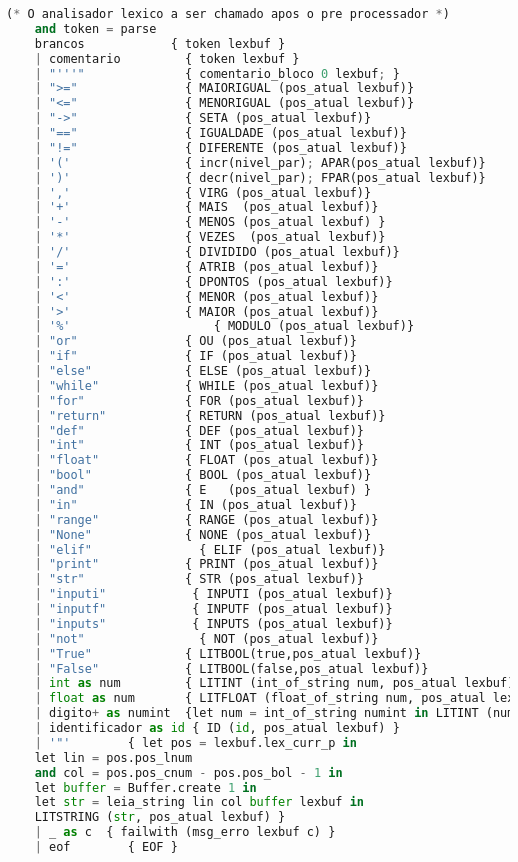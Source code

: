 \documentclass[hidelinks,12pt]{article}
\begin{document}
\begin{appendices}
\begin{lstlisting}[caption=lexico.mll, language=python]
	(* O analisador lexico a ser chamado apos o pre processador *)
	and token = parse
	brancos            { token lexbuf }
	| comentario         { token lexbuf }
	| "'''"              { comentario_bloco 0 lexbuf; }
	| ">="               { MAIORIGUAL (pos_atual lexbuf)}
	| "<="               { MENORIGUAL (pos_atual lexbuf)}
	| "->"               { SETA (pos_atual lexbuf)}
	| "=="               { IGUALDADE (pos_atual lexbuf)}
	| "!="               { DIFERENTE (pos_atual lexbuf)}
	| '('                { incr(nivel_par); APAR(pos_atual lexbuf)}
	| ')'                { decr(nivel_par); FPAR(pos_atual lexbuf)}
	| ','                { VIRG (pos_atual lexbuf)}
	| '+'                { MAIS  (pos_atual lexbuf)}
	| '-'                { MENOS (pos_atual lexbuf) }
	| '*'                { VEZES  (pos_atual lexbuf)}
	| '/'                { DIVIDIDO (pos_atual lexbuf)}
	| '='                { ATRIB (pos_atual lexbuf)}
	| ':'                { DPONTOS (pos_atual lexbuf)}
	| '<'                { MENOR (pos_atual lexbuf)}
	| '>'                { MAIOR (pos_atual lexbuf)}
	| '%'		             { MODULO (pos_atual lexbuf)}
	| "or"               { OU (pos_atual lexbuf)}
	| "if"               { IF (pos_atual lexbuf)}
	| "else"             { ELSE (pos_atual lexbuf)}
	| "while"            { WHILE (pos_atual lexbuf)}
	| "for"              { FOR (pos_atual lexbuf)}
	| "return"           { RETURN (pos_atual lexbuf)}
	| "def"              { DEF (pos_atual lexbuf)}
	| "int"              { INT (pos_atual lexbuf)}
	| "float"            { FLOAT (pos_atual lexbuf)}
	| "bool"             { BOOL (pos_atual lexbuf)}
	| "and"              { E   (pos_atual lexbuf) }
	| "in"               { IN (pos_atual lexbuf)}
	| "range"            { RANGE (pos_atual lexbuf)}
	| "None"             { NONE (pos_atual lexbuf)}
	| "elif"	           { ELIF (pos_atual lexbuf)}
	| "print"            { PRINT (pos_atual lexbuf)}
	| "str"              { STR (pos_atual lexbuf)}
	| "inputi"            { INPUTI (pos_atual lexbuf)}
	| "inputf"            { INPUTF (pos_atual lexbuf)}
	| "inputs"            { INPUTS (pos_atual lexbuf)}
	| "not"		           { NOT (pos_atual lexbuf)}
	| "True"             { LITBOOL(true,pos_atual lexbuf)}
	| "False"            { LITBOOL(false,pos_atual lexbuf)}
	| int as num         { LITINT (int_of_string num, pos_atual lexbuf) } 
	| float as num       { LITFLOAT (float_of_string num, pos_atual lexbuf) }
	| digito+ as numint  {let num = int_of_string numint in LITINT (num, pos_atual lexbuf)}
	| identificador as id { ID (id, pos_atual lexbuf) }
	| '"'        { let pos = lexbuf.lex_curr_p in
	let lin = pos.pos_lnum
	and col = pos.pos_cnum - pos.pos_bol - 1 in
	let buffer = Buffer.create 1 in 
	let str = leia_string lin col buffer lexbuf in
	LITSTRING (str, pos_atual lexbuf) }
	| _ as c  { failwith (msg_erro lexbuf c) }
	| eof        { EOF }
	

\end{lstlisting}
\end{appendices}
\end{document}
